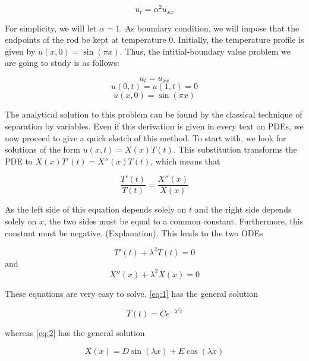 \documentclass{article}
\begin{document}
\begin{equation}
    u_t = \alpha^2 u_{xx}
\end{equation}

For simplicity, we will let $\alpha=1$. As boundary condition, we will impose that the endpoints of the rod be kept at temperature 0. Initially, the temperature profile is given by $u(x, 0) = \sin(\pi x)$. Thus, the intitial-boundary value problem we are going to study is as follows:

\begin{equation}
    u_t = u_{xx}
\end{equation}
\begin{equation}
    u(0, t) = u(1, t) = 0
\end{equation}
\begin{equation}
    u(x, 0) = \sin(\pi x)
\end{equation}

The analytical solution to this problem can be found by the classical technique of separation by variables. Even if this derivation is given in every text on PDEs, we now proceed to give a quick sketch of this method. To start with, we look for solutions of the form $u(x, t) = X(x) T(t)$. This substitution transforms the PDE to $X(x) T'(t) = X''(x) T(t)$, which means that

\begin{equation}
    \frac{T'(t)}{T(t)} = \frac{X''(x)}{X(x)}
\end{equation}

As the left side of this equation depends solely on $t$ and the right side depends solely on $x$, the two sides must be equal to a common constant. Furthermore, this constant must be negative. (Explanation). This leads to the two ODEs

\begin{equation}
    T'(t) + \lambda^2 T(t) = 0\label{eq:1}
\end{equation}
and
\begin{equation}
    X''(x) + \lambda^2 X(x) = 0\label{eq:2}
\end{equation}

These equations are very easy to solve. \eqref{eq:1} has the general solution

\begin{equation}
    T(t) = C e^{-\lambda^2 t}
\end{equation}

whereas \eqref{eq:2} has the general solution

\begin{equation}
    X(x) = D \sin(\lambda x) + E \cos(\lambda x)
\end{equation}
\end{document}
